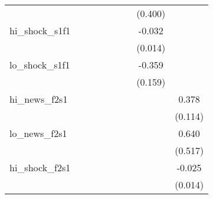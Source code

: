 {\begin{tabular}{l*{8}{c}}
            &                     &                     &                     &                     &                     &                     &     (0.400)         &                     \\
\addlinespace
hi\_shock\_s1f1&                     &                     &                     &                     &                     &                     &      -0.032\sym{**} &                     \\
            &                     &                     &                     &                     &                     &                     &     (0.014)         &                     \\
\addlinespace
lo\_shock\_s1f1&                     &                     &                     &                     &                     &                     &      -0.359\sym{**} &                     \\
            &                     &                     &                     &                     &                     &                     &     (0.159)         &                     \\
\addlinespace
hi\_news\_f2s1&                     &                     &                     &                     &                     &                     &                     &       0.378\sym{***}\\
            &                     &                     &                     &                     &                     &                     &                     &     (0.114)         \\
\addlinespace
lo\_news\_f2s1&                     &                     &                     &                     &                     &                     &                     &       0.640         \\
            &                     &                     &                     &                     &                     &                     &                     &     (0.517)         \\
\addlinespace
hi\_shock\_f2s1&                     &                     &                     &                     &                     &                     &                     &      -0.025\sym{*}  \\
            &                     &                     &                     &                     &                     &                     &                     &     (0.014)         \\

\end{tabular}}
